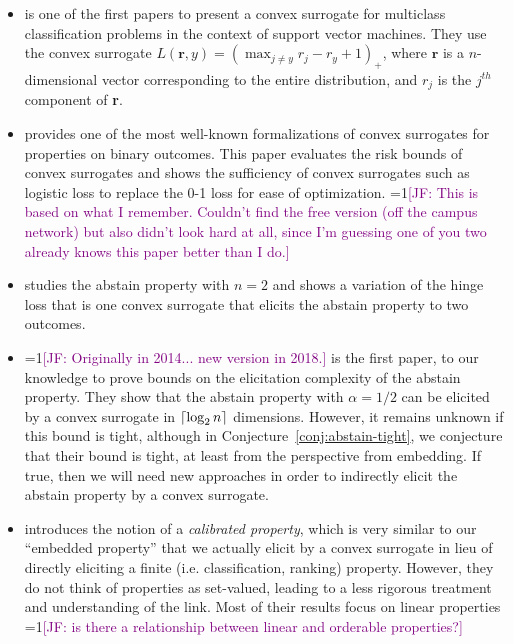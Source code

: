 \documentclass[anon,12pt]{colt2019}
\newcommand{\Comments}{1}
\newcommand{\mynote}[2]{\ifnum\Comments=1\textcolor{#1}{#2}\fi}
\newcommand{\jessie}[1]{\mynote{purple}{[JF: #1]}}
\DeclarePairedDelimiter\ceil{\lceil}{\rceil}
\begin{document}
\begin{itemize}
  \item \cite{crammer2001algorithmic} is one of the first papers to present a convex surrogate for multiclass classification problems in the context of support vector machines.
  They use the convex surrogate $L(\textbf{r},y) = (\max_{j\neq y} r_j - r_y + 1)_+$, where $\textbf{r}$ is a $n$-dimensional vector corresponding to the entire distribution, and $r_j$ is the $j^{th}$ component of \textbf{r}.
  \item \cite{bartlett2006convexity} provides one of the most well-known formalizations of convex surrogates for properties on binary outcomes.
  This paper evaluates the risk bounds of convex surrogates and shows the sufficiency of convex surrogates such as logistic loss to replace the 0-1 loss for ease of optimization. \jessie{This is based on what I remember.  Couldn't find the free version (off the campus network) but also didn't look hard at all, since I'm guessing one of you two already knows this paper better than I do.}
  \item \cite{bartlett2008classification} studies the abstain property with $n=2$ and shows a variation of the hinge loss that is one convex surrogate that elicits the abstain property to two outcomes.
  
  \item \cite{ramaswamy2018consistent} \jessie{Originally in 2014... new version in 2018.} is the first paper, to our knowledge to prove bounds on the elicitation complexity of the abstain property.
  They show that the abstain property with $\alpha = 1/2$ can be elicited by a convex surrogate in $\ceil*{\log_2 n}$ dimensions.
  However, it remains unknown if this bound is tight, although in Conjecture~\ref{conj:abstain-tight}, we conjecture that their bound is tight, at least from the perspective from embedding.
  If true, then we will need new approaches in order to indirectly elicit the abstain property by a convex surrogate.
  \item \cite{agarwal2015consistent} introduces the notion of a \emph{calibrated property}, which is very similar to our ``embedded property'' that we actually elicit by a convex surrogate in lieu of directly eliciting a finite (i.e. classification, ranking) property.
  However, they do not think of properties as set-valued, leading to a less rigorous treatment and understanding of the link.
  Most of their results focus on linear properties \jessie{is there a relationship between linear and orderable properties?}
	

\end{itemize}
\end{document}
